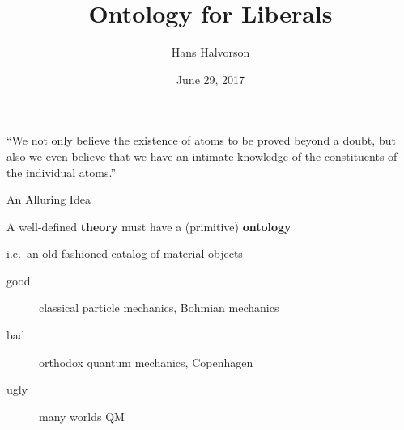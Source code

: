 \documentclass[17pt]{beamer}
\title{Ontology for Liberals}
\author{Hans Halvorson}
\date{June 29, 2017}
\begin{document}
\def\2{\mathcal}
\def\7{\mathfrak}









\begin{frame}

\maketitle 

\end{frame}

\begin{frame}

  ``We not only believe the existence of atoms to be proved beyond a
  doubt, but also we even believe that we have an intimate knowledge
  of the constituents of the individual atoms.''
  

\end{frame}


\begin{frame}{An Alluring Idea}

  A well-defined \textbf{theory} must have a (primitive)
  \textbf{ontology}

  \bigskip i.e.\ an old-fashioned catalog of material objects 


\end{frame}
\begin{frame}

  \begin{description}
\item[good] classical particle mechanics, Bohmian mechanics
\item[bad] orthodox quantum mechanics, Copenhagen
\item[ugly] many worlds QM 
\end{description}


\end{frame}
\end{document}
